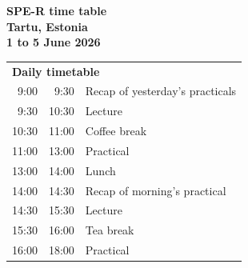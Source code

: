 \documentclass[a4paper, 12pt]{article}
\begin{document}
\begin{center}
\huge \bf SPE-R time table \\
\large \bf Tartu, Estonia  \\
\large \bf 1 to 5 June  2026 \\
\end{center}

\noindent
\begin{tabular}{r@{ -- }rp{13cm}}
\multicolumn{3}{l}{\bf Daily timetable} \\
 9:00 &  9:30 & Recap of yesterday's practicals \\
 9:30 & 10:30 & Lecture \\
10:30 & 11:00 & Coffee break \\
11:00 & 13:00 & Practical \\
13:00 & 14:00 & Lunch \\
14:00 & 14:30 & Recap of morning's practical \\
14:30 & 15:30 & Lecture \\
15:30 & 16:00 & Tea break \\
16:00 & 18:00 & Practical \\[2em]
\end{tabular}
\end{document}

